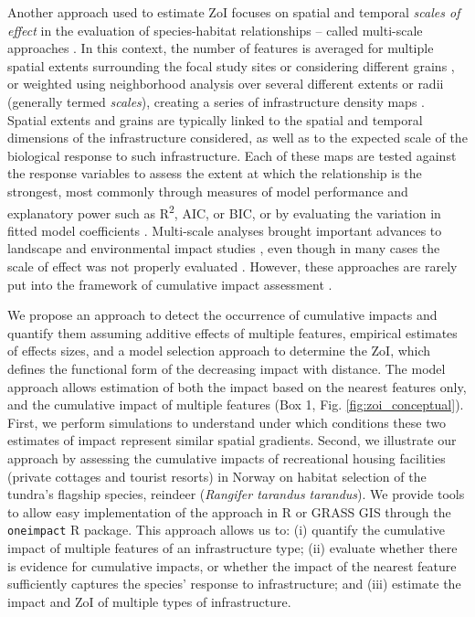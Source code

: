 \documentclass[titlepage]{article}
\begin{document}
Another approach used to estimate ZoI focuses on spatial and temporal \textit{scales of effect} in the evaluation of species-habitat relationships -- called multi-scale approaches \citep[e.g.][]{zeller_multi-level_2017}. In this context, the number of features is averaged for multiple spatial extents surrounding the focal study sites \citep{jackson_are_2015} or considering different grains \citep{laforge_process-focussed_2015}, or weighted using neighborhood analysis over several different extents or radii (generally termed \textit{scales}), creating a series of infrastructure density maps \citep{mcgarigal_multi-scale_2016}. Spatial extents and grains are typically linked to the spatial and temporal dimensions of the infrastructure considered, as well as to the expected scale of the biological response to such infrastructure. Each of these maps are tested against the response variables to assess the extent at which the relationship is the strongest, most commonly through measures of model performance and explanatory power such as R\textsuperscript{2}, AIC, or BIC, or by evaluating the variation in fitted model coefficients \citep{jackson_are_2015, huais_multifit_2018}.
Multi-scale analyses brought important advances to landscape and environmental impact studies \citep[e.g.][]{mcgarigal_multi-scale_2016}, even though in many cases the scale of effect was not properly evaluated \citep{jackson_are_2015}. However, these approaches are rarely put into the framework of cumulative impact assessment \citep[but see][]{polfus_identifying_2011}.

We propose an approach to detect the occurrence of cumulative impacts and quantify them assuming additive effects of multiple features, empirical estimates of effects sizes, and a model selection approach to determine the ZoI, which defines the functional form of the decreasing impact with distance. The model approach allows estimation of both the impact based on the nearest features only, and the cumulative impact of multiple features (Box 1, Fig. \ref{fig:zoi_conceptual}). First, we perform simulations to understand under which conditions these two estimates of impact represent similar spatial gradients.
Second, we illustrate our approach by assessing the cumulative impacts of recreational housing facilities (private cottages and tourist resorts) in Norway on habitat selection of the tundra's flagship species, reindeer (\textit{Rangifer tarandus tarandus}). We provide tools to allow easy implementation of the approach in R \citep{r_core_team_r_2020} or GRASS GIS \citep{grass_development_team_geographic_2017} through the \verb|oneimpact| R package. This approach allows us to: (i) quantify the cumulative impact of multiple features of an infrastructure type; (ii) evaluate whether there is evidence for cumulative impacts, or whether the impact of the nearest feature sufficiently captures the species' response to infrastructure; and (iii) estimate the impact and ZoI of multiple types of infrastructure. 
\end{document}
